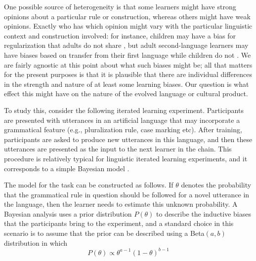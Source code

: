 \documentclass[doc]{apa6}
\begin{document}
One possible source of heterogeneity is that some learners might have {\sc strong} opinions about a particular rule or construction, whereas others might have {\sc weak} opinions. Exactly who has which opinion might vary with the particular linguistic context and construction involved: for instance, children may have a bias for regularization that adults do not share \parencite{hudsonkamnewport05}, but adult second-language learners may have biases based on transfer from their first language while children do not \parencite{ellis15}. We are fairly agnostic at this point about what such biases might be; all that matters for the present purposes is that it is plausible that there are individual differences in the strength and nature of at least some learning biases. Our question is what effect this might have on the nature of the evolved language or cultural product.

To study this, consider the following iterated learning experiment. Participants are presented with utterances in an artificial language that may incorporate a grammatical feature (e.g., pluralization rule, case marking etc). After training, participants are asked to produce new utterances in this language, and then these utterances are presented as the input to the next learner in the chain. This procedure is relatively typical for linguistic iterated learning experiments, and it corresponds to a simple Bayesian model \parencite{realigriffiths09,smithwonnacott10,ferdinandetal14}.

The model for the task can be constructed as follows. If $\theta$ denotes the probability that the grammatical rule in question should be followed for a novel utterance in the language, then the learner needs to estimate this unknown probability. A Bayesian analysis uses a prior distribution $P(\theta)$ to describe the inductive biases that the participants bring to the experiment, and a standard choice in this scenario is to assume that the prior can be described using a Beta$(a,b)$ distribution in which 
$$
P(\theta) \propto \theta^{a-1} (1-\theta)^{b-1}
$$
\end{document}
